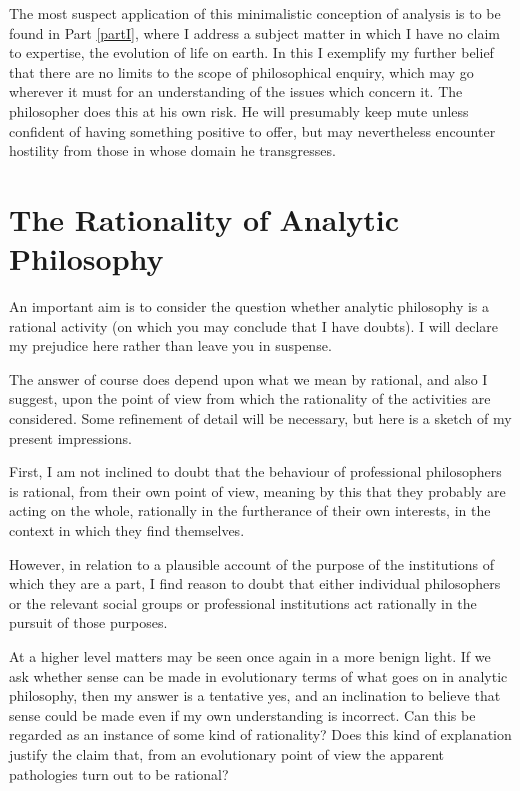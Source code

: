 The most suspect application of this minimalistic conception of analysis is to be found in Part \ref{partI}, where I address a subject matter in which I have no claim to expertise, the evolution of life on earth.
In this I exemplify my further belief that there are no limits to the scope of philosophical enquiry, which may go wherever it must for an understanding of the issues which concern it.
The philosopher does this at his own risk.
He will presumably keep mute unless confident of having something positive to offer, but may nevertheless encounter hostility from those in whose domain he transgresses.

\section{The Rationality of Analytic Philosophy}

An important aim is to consider the question whether analytic philosophy is a rational activity (on which you may conclude that I have doubts).
I will declare my prejudice here rather than leave you in suspense.

The answer of course does depend upon what we mean by rational, and also I suggest, upon the point of view from which the rationality of the activities are considered.
Some refinement of detail will be necessary, but here is a sketch of my present impressions.

First, I am not inclined to doubt that the behaviour of professional philosophers is rational, from their own point of view, meaning by this that they probably are acting on the whole, rationally in the furtherance of their own interests, in the context in which they find themselves.

However, in relation to a plausible account of the purpose of the institutions of which they are a part, I find reason to doubt that either individual philosophers or the relevant social groups or professional institutions act rationally in the pursuit of those purposes.

At a higher level matters may be seen once again in a more benign light.
If we ask whether sense can be made in evolutionary terms of what goes on in analytic philosophy, then my answer is a tentative yes, and an inclination to believe that sense could be made even if my own understanding is incorrect.
Can this be regarded as an instance of some kind of rationality?
Does this kind of explanation justify the claim that, from an evolutionary point of view the apparent pathologies turn out to be rational?

